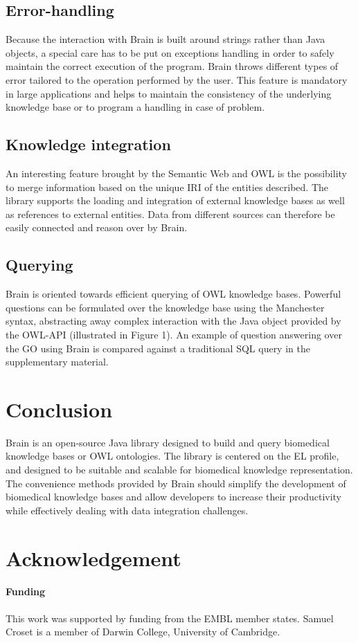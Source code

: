 \documentclass{bioinfo}
\begin{document}
\subsection{Error-handling}
Because the interaction with Brain is built around strings rather than Java objects, a special care has to be put on
exceptions handling in order to safely maintain the correct execution of the program. Brain throws different types of error tailored 
to the operation performed by the user. This feature is mandatory in large applications and helps to maintain the consistency of the underlying
knowledge base or to program a handling in case of problem.
\subsection{Knowledge integration}
An interesting feature brought by the Semantic Web and OWL is the possibility to merge information based
on the unique IRI of the entities described. The library supports the loading and integration of external knowledge bases as well as 
references to external entities. Data from different sources can therefore be easily connected and reason over by Brain.
\subsection{Querying}
Brain is oriented towards efficient querying of OWL knowledge bases.
Powerful questions can be formulated over the knowledge base using the Manchester syntax, abstracting
away complex interaction with the Java object provided by the OWL-API (illustrated in Figure 1).
An example of question answering over the GO using Brain
is compared against a traditional SQL query in the supplementary material.

\section{Conclusion}
Brain is an open-source Java library designed to build and query biomedical knowledge bases or OWL ontologies.
The library is centered on the EL profile, and designed to be suitable and scalable for biomedical knowledge representation.
The convenience methods provided by Brain should simplify the development of biomedical knowledge bases and allow developers
to increase their productivity while effectively dealing with data integration challenges.

\section*{Acknowledgement}
\paragraph{Funding\textcolon}
This work was supported by funding from the EMBL member states. Samuel Croset is a member of Darwin College, University of Cambridge.









 

\end{document}
